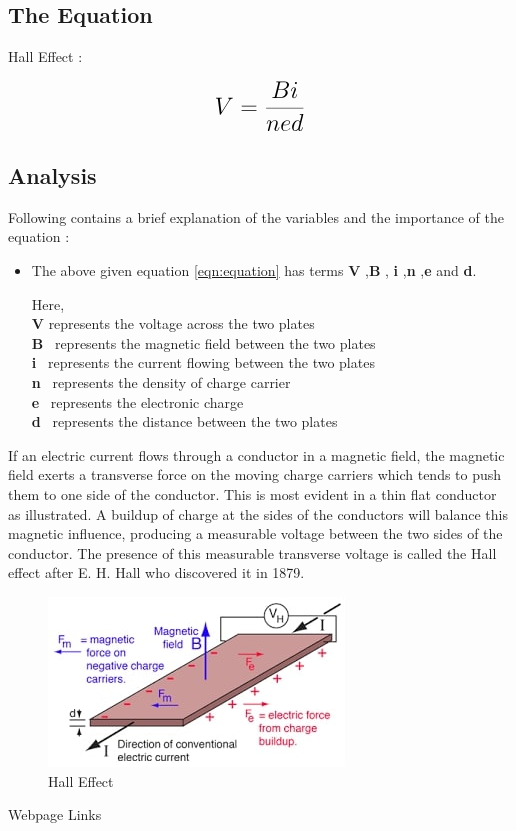 \subsection{The Equation}



Hall Effect  :  

\begin{equation}
 {\LARGE{\textbf{$V =\frac{Bi}{{ned}}$}}}
 \label{eqn:equation}
\end{equation}


\subsection{Analysis}
Following contains a brief explanation of the variables and the importance of the equation :
\begin{itemize}

  \item {\normalsize {The above given equation \ref{eqn:equation} has terms \textbf{V} ,\textbf{B} , \textbf{i} ,\textbf{n} ,\textbf{e} and  \textbf{d}.}}

{\normalsize { Here,}}\\
{\normalsize {\textbf{V} represents the voltage across the two plates }}\\
{\normalsize {\textbf{B} \  represents the magnetic field between the two plates}}\\
{\normalsize {\textbf{i} \  represents the current flowing between the two plates}}\\
{\normalsize {\textbf{n} \  represents the density of charge carrier}}\\
{\normalsize{\textbf{e} \ represents the electronic charge}}\\
{\normalsize{\textbf{d} \ represents the distance between the two plates}}
\end{itemize}



If an electric current flows through a conductor in a magnetic field, the magnetic field exerts a transverse force on the moving charge carriers which tends to push them to one side of the conductor. This is most evident in a thin flat conductor as illustrated. A buildup of charge at the sides of the conductors will balance this magnetic influence, producing a measurable voltage between the two sides of the conductor. The presence of this measurable transverse voltage is called the Hall effect after E. H. Hall who discovered it in 1879.

\begin{figure}[h]
	{\begin{center}
		\includegraphics[scale=0.55]{ME20B004.jpg}
	\end{center}}
	\caption{Hall Effect \cite{pic}}
	\label{f1:image}
\end{figure}

Webpage Links \cite{weblink}

